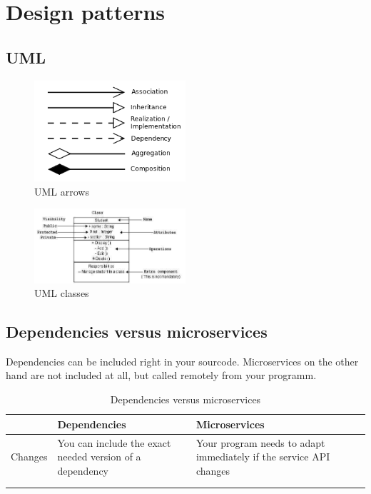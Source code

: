 \section{Design patterns}

\subsection{UML}
\begin{figure}[h]
\caption{UML arrows}
\centering
\includegraphics[width=0.5\textwidth]{images/umlArrows.png}
\end{figure}


\begin{figure}[h]
\caption{UML classes}
\centering
\includegraphics[width=0.5\textwidth]{images/umlClass.jpg}
\end{figure}

\subsection{Dependencies versus microservices}

Dependencies can be included right in your sourcode. Microservices on the other hand are not included at all, but called remotely from your programm. 


\begin{table}[h]
\centering
\caption{Dependencies versus microservices}
\begin{tabular}{@{}lllll@{}}
\toprule
        & Dependencies                                             & Microservices                                                      &  &  \\ \midrule
Changes & You can include the exact needed version of a dependency & Your program needs to adapt immediately if the service API changes &  &  \\
        &                                                          &                                                                    &  &  \\
        &                                                          &                                                                    &  &  \\ \bottomrule
\end{tabular}
\end{table}




